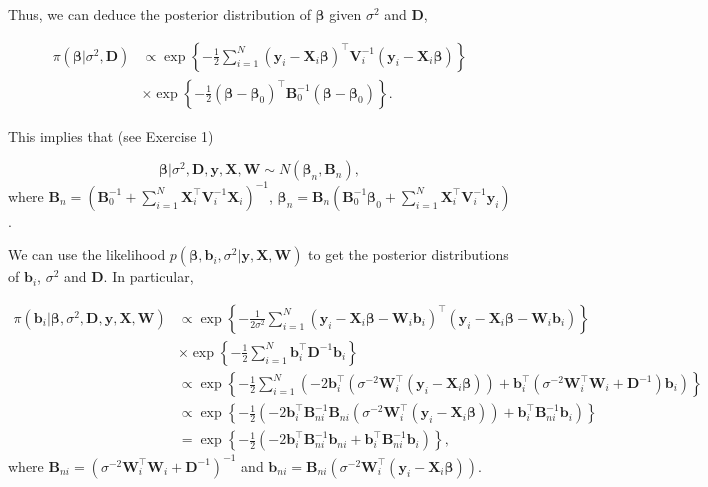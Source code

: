Thus, we can deduce the posterior distribution of $\bm{\beta}$ given $\sigma^2$ and $\bm{D}$,

\begin{align*}
	\pi(\bm{\beta}|\sigma^2, \bm{D}) & \propto \exp\left\{-\frac{1}{2}\sum_{i=1}^N(\bm{y}_i-\bm{X}_i\bm{\beta})^{\top}\bm{V}_i^{-1}(\bm{y}_i-\bm{X}_i\bm{\beta})\right\}\\
	&\times \exp\left\{-\frac{1}{2}(\bm{\beta}-\bm{\beta}_0)^{\top}\bm{B}_0^{-1}(\bm{\beta}-\bm{\beta}_0)\right\}.
\end{align*} 

This implies that (see Exercise 1)  

\begin{equation*}
	\bm{\beta}|\sigma^2,\bm{D},\bm{y}, \bm{X}, \bm{W} \sim {N}(\bm{\beta}_n,\bm{B}_n), 
\end{equation*}
where $\bm{B}_n = (\bm{B}_0^{-1} +\sum_{i=1}^N \bm{X}_i^{\top}\bm{V}_i^{-1}\bm{X}_i)^{-1}$, $\bm{\beta}_n= \bm{B}_n(\bm{B}_0^{-1}\bm{\beta}_0 + \sum_{i=1}^N\bm{X}_i^{\top}\bm{V}_i^{-1}\bm{y}_i)$.

We can use the likelihood $p(\bm{\beta},\bm{b}_i,\sigma^2|\bm{y}, \bm{X},\bm{W})$ to get the posterior distributions of $\bm{b}_i$, $\sigma^2$ and $\bm{D}$. In particular,

\begin{align*}
	\pi(\bm{b}_i|\bm{\beta},\sigma^2,\bm{D},\bm{y}, \bm{X}, \bm{W})&\propto \exp\left\{-\frac{1}{2\sigma^2}\sum_{i=1}^N(\bm{y}_i-\bm{X}_i\bm{\beta}-\bm{W}_i\bm{b}_i)^{\top}(\bm{y}_i-\bm{X}_i\bm{\beta}-\bm{W}_i\bm{b}_i)\right\}\\
	&\times \exp\left\{-\frac{1}{2}\sum_{i=1}^N \bm{b}_i^{\top}\bm{D}^{-1}\bm{b}_i\right\}\\
	&\propto\exp\left\{-\frac{1}{2}\sum_{i=1}^N(-2\bm{b}_i^{\top}(\sigma^{-2}\bm{W}_i^{\top}(\bm{y}_i-\bm{X}_i\bm{\beta}))+ \bm{b}_i^{\top}(\sigma^{-2}\bm{W}_i^{\top}\bm{W}_i+\bm{D}^{-1})\bm{b}_i)\right\}\\
	&\propto\exp\left\{-\frac{1}{2}(-2\bm{b}_i^{\top}\bm{B}_{ni}^{-1}\bm{B}_{ni}(\sigma^{-2}\bm{W}_i^{\top}(\bm{y}_i-\bm{X}_i\bm{\beta}))+ \bm{b}_i^{\top}\bm{B}_{ni}^{-1}\bm{b}_i)\right\}\\
	&=\exp\left\{-\frac{1}{2}(-2\bm{b}_i^{\top}\bm{B}_{ni}^{-1}\bm{b}_{ni}+ \bm{b}_i^{\top}\bm{B}_{ni}^{-1}\bm{b}_i)\right\}, 
\end{align*}
where $\bm{B}_{ni}=(\sigma^{-2}\bm{W}_i^{\top}\bm{W}_i+\bm{D}^{-1})^{-1}$ and $\bm{b}_{ni}=\bm{B}_{ni}(\sigma^{-2}\bm{W}_i^{\top}(\bm{y}_i-\bm{X}_i\bm{\beta}))$.

